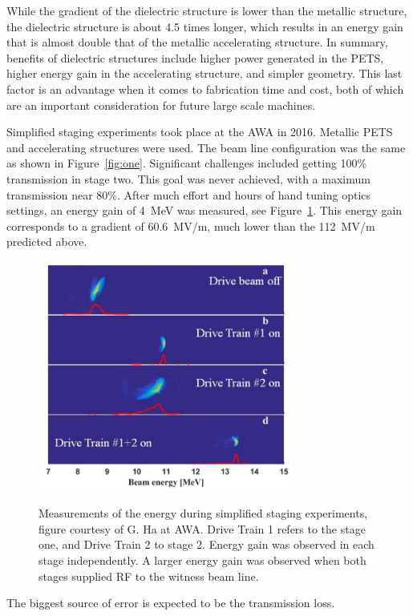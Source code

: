 While the gradient of the dielectric structure is lower than the metallic structure, the dielectric 
structure is about 4.5 times longer, which results in an energy gain that is 
almost double that of the metallic accelerating structure.
In summary, benefits of dielectric structures include higher power
generated in the PETS, higher energy gain in the accelerating structure, 
and simpler geometry. This last factor is an advantage when it comes 
to fabrication time and cost, both of which are an important consideration for future large scale machines. 



Simplified staging experiments took place at the AWA in 2016. 
Metallic PETS and accelerating structures were used. 
The beam line configuration was the same as shown in Figure~\ref{fig:one}.
Significant challenges included getting 100\% transmission in stage two.
This goal was never achieved, with a maximum transmission near 80\%. 
After much effort and hours of hand tuning optics settings, 
an energy gain of \SI{4}{MeV} was measured, see Figure~\ref{fig:old-tba}. 
This energy gain corresponds to a 
gradient of \SI{60.6}{MV/m}, much lower than the \SI{112}{MV/m} predicted above.
\begin{figure}
	\centering
	\includegraphics[width=0.75\textwidth]{images/old_tba}
	\label{fig:old-tba}
	\caption{Measurements of the energy during simplified staging experiments, 
		figure courtesy of G. Ha at AWA.
		Drive Train 1 refers to the stage one, and Drive Train 2 to stage 2. 
		Energy gain was observed in each stage independently.
		A larger energy gain was observed when both stages supplied RF to the witness beam line.}
\end{figure}
The biggest source of error is expected to be the transmission loss. 




